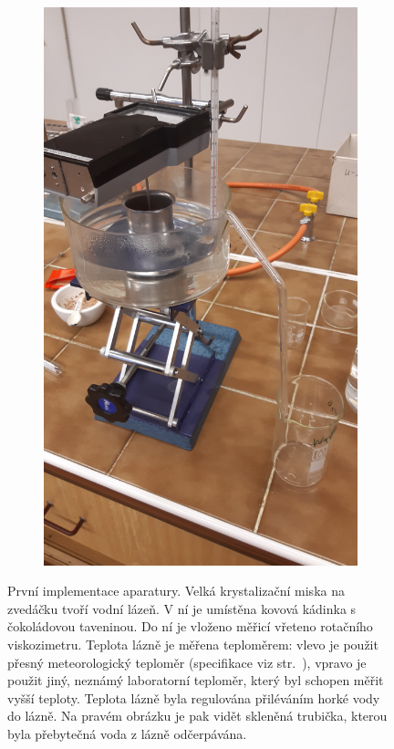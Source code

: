 \documentclass[12pt]{article}
\begin{document}
\begin{figure}
\begin{subfigure}[b]{.5\textwidth}
        \includegraphics[angle = 270, width = \textwidth]{figures/aparatura_2.jpg}
    \end{subfigure}
    \caption{První implementace aparatury. Velká krystalizační miska na zvedáčku tvoří vodní lázeň. V ní je umístěna kovová kádinka s čokoládovou taveninou. Do ní je vloženo měřicí vřeteno rotačního viskozimetru. Teplota lázně je měřena teploměrem: vlevo je použit přesný meteorologický teploměr (specifikace viz str.~\pageref{sec:teploměr}), vpravo je použit jiný, neznámý laboratorní teploměr, který byl schopen měřit vyšší teploty. Teplota lázně byla regulována přiléváním horké vody do lázně. Na pravém obrázku je pak vidět skleněná trubička, kterou byla přebytečná voda z lázně odčerpávána.}
    \label{fig:aparatura}
\end{figure}
\end{document}
